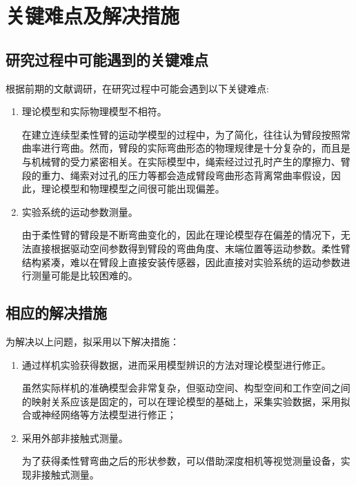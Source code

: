 \chapter{关键难点及解决措施}
\section{研究过程中可能遇到的关键难点}
根据前期的文献调研，在研究过程中可能会遇到以下关键难点:
\begin{enumerate}
	\item 理论模型和实际物理模型不相符。
	
	在建立连续型柔性臂的运动学模型的过程中，为了简化，往往认为臂段按照常曲率进行弯曲。然而，臂段的实际弯曲形态的物理规律是十分复杂的，而且是与机械臂的受力紧密相关。在实际模型中，绳索经过过孔时产生的摩擦力、臂段的重力、绳索对过孔的压力等都会造成臂段弯曲形态背离常曲率假设，因此，理论模型和物理模型之间很可能出现偏差。
	
	\item 实验系统的运动参数测量。
	
	由于柔性臂的臂段是不断弯曲变化的，因此在理论模型存在偏差的情况下，无法直接根据驱动空间参数得到臂段的弯曲角度、末端位置等运动参数。柔性臂结构紧凑，难以在臂段上直接安装传感器，因此直接对实验系统的运动参数进行测量可能是比较困难的。
	
\end{enumerate}
\section{相应的解决措施}
为解决以上问题，拟采用以下解决措施：
\begin{enumerate}
	\item 通过样机实验获得数据，进而采用模型辨识的方法对理论模型进行修正。
	
	虽然实际样机的准确模型会非常复杂，但驱动空间、构型空间和工作空间之间的映射关系应该是固定的，可以在理论模型的基础上，采集实验数据，采用拟合或神经网络等方法模型进行修正；
	
	\item 采用外部非接触式测量。
	
	为了获得柔性臂弯曲之后的形状参数，可以借助深度相机等视觉测量设备，实现非接触式测量。
\end{enumerate}